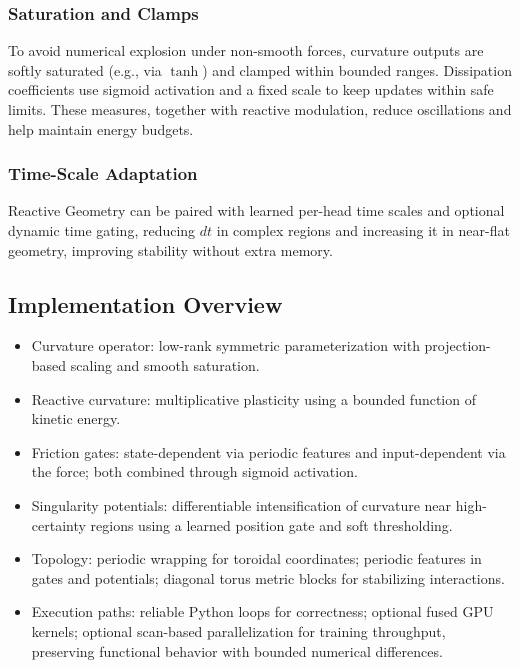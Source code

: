 \documentclass{article}
\numberwithin{equation}{section}
\begin{document}
\subsubsection{Saturation and Clamps}
To avoid numerical explosion under non-smooth forces, curvature outputs are softly saturated (e.g., via $\tanh$) and clamped within bounded ranges. Dissipation coefficients use sigmoid activation and a fixed scale to keep updates within safe limits. These measures, together with reactive modulation, reduce oscillations and help maintain energy budgets.

\subsubsection{Time-Scale Adaptation}
Reactive Geometry can be paired with learned per-head time scales and optional dynamic time gating, reducing $dt$ in complex regions and increasing it in near-flat geometry, improving stability without extra memory.

\subsection{Implementation Overview}
\begin{itemize}
\item Curvature operator: low-rank symmetric parameterization with projection-based scaling and smooth saturation.
\item Reactive curvature: multiplicative plasticity using a bounded function of kinetic energy.
\item Friction gates: state-dependent via periodic features and input-dependent via the force; both combined through sigmoid activation.
\item Singularity potentials: differentiable intensification of curvature near high-certainty regions using a learned position gate and soft thresholding.
\item Topology: periodic wrapping for toroidal coordinates; periodic features in gates and potentials; diagonal torus metric blocks for stabilizing interactions.
\item Execution paths: reliable Python loops for correctness; optional fused GPU kernels; optional scan-based parallelization for training throughput, preserving functional behavior with bounded numerical differences.
\end{itemize}
\end{document}
